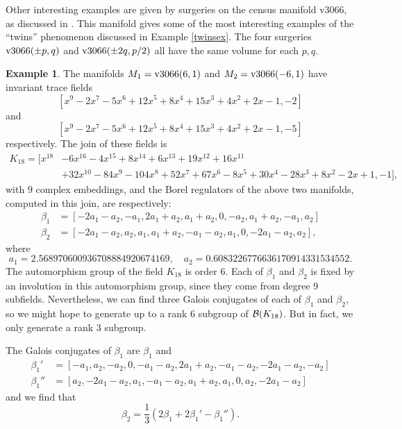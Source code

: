 \documentclass[a4paper]{amsart}
\def\K{\tilde{K}}
\theoremstyle{definition}
\newtheorem{example}[theorem]{Example}
\begin{document}
Other interesting examples are given by surgeries on the census
manifold \hbox{v3066}, as discussed in \cite{neumann-yang3}.  This
manifold gives some of the most interesting examples of the ``twins''
phenomenon discussed in Example \ref{twinsex}. The four surgeries
$\hbox{v3066}(\pm p,q)$ and $\hbox{v3066}(\pm 2q, p/2)$ all have the
same volume for each $p,q$.
\begin{example}\label{v3066}\def\K{K_{18}} The manifolds
$M_1=\hbox{v3066}(6,1)$ and $M_2=\hbox{v3066}(-6,1)$ have invariant
trace fields
$$[x^9 - 2x^7 - 5x^6 + 12x^5 + 8x^4 + 15x^3 + 4x^2 + 2x - 1,-2]$$ and
$$[x^9 - 2x^7 - 5x^6 + 12x^5 + 8x^4 + 15x^3 + 4x^2 + 2x - 1,-5]$$
respectively. The join of these fields is $$
\begin{aligned}\K=[x^{18}& - 6x^{16} - 4x^{15} + 8x^{14} + 6x^{13} +
19x^{12} + 16x^{11}\\& + 32x^{10} - 84x^9 - 104x^8 + 52x^7 + 67x^6 -
8x^5 + 30x^4 - 28x^3 + 8x^2 - 2x + 1,-1],\end{aligned} $$ with $9$
complex embeddings, and the Borel regulators of the above two
manifolds, computed in this join, are respectively:
$$\begin{aligned}
\beta_1&=[-2a_1-a_2,-a_1,2a_1+a_2,a_1+a_2,0,-a_2,a_1+a_2,-a_1,a_2]\\
\beta_2&=[-2a_1-a_2,a_2,a_1,a_1+a_2,-a_1-a_2,a_1,0,-2a_1-a_2,a_2],
\end{aligned}
$$ where $$a_1=2.568970600936708884920674169,\quad
a_2=0.6083226776636170914331534552. $$ The automorphism group of the
field $\K$ is order $6$. Each of $\beta_1$ and $\beta_2$ is fixed by
an involution in this automorphism group, since they come from degree
9 subfields. Nevertheless, we can find three Galois conjugates of each
of $\beta_1$ and $\beta_2$, so we might hope to generate up to a rank
6 subgroup of $\Bloch(\K)$. But in fact, we only generate a rank 3
subgroup.
\iffalse
\footnote{This is in keeping with the Ramakrishnan conjecture,
Conjecture \ref{rama}, which would imply that the first coordinate of
the Borel regulator should have rank 1 kernel in this case. Indeed, it
is shown in
\cite{neumann-yang2} (see also the proof of Theorem \ref{sc} below)
that the conjecture would imply the kernel of the $i$-th coordinate
has rank equal to the number of complex embeddings of the real
subfield of $\sigma_i(\K)$ (the $i$-th complex embedding). This
subfield is degree 3 with 1 complex embedding in our case.}. \fi

The Galois conjugates of $\beta_1$ are $\beta_1$ and $$\begin{aligned}
\beta_1'&=[-a_1,a_2,-a_2,0,-a_1-a_2,2a_1+a_2,-a_1-a_2,-2a_1-a_2,-a_2]\\
\beta_1''&=[a_2,-2a_1-a_2,a_1,-a_1-a_2,a_1+a_2,a_1,0,a_2,-2a_1-a_2]
\end{aligned}
$$ and we find that
$$\beta_2=\frac13(2\beta_1+2\beta_1'-\beta_1'').$$ 


\end{example}
\end{document}
